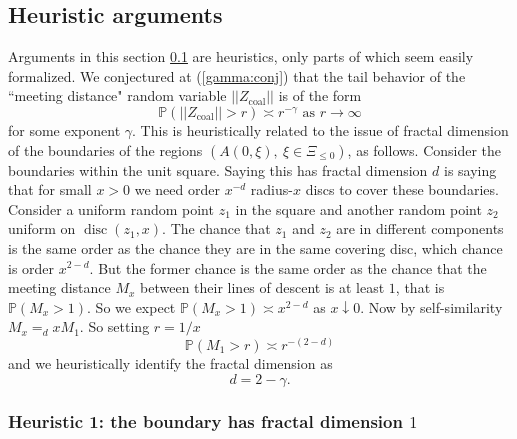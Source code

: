 \documentclass[12pt]{article}
\renewcommand{\Pr}{{\mathbb P}}
\newcommand{\Zcouple}{Z_{\mathrm{coal}}}
\DeclareMathOperator{\disc}{disc}
\begin{document}
\vspace*{-2.5in}








\subsection{Heuristic arguments}
\label{sec:2heuristics} 
Arguments in this section \ref{sec:2heuristics} are heuristics, only parts of which seem easily formalized.
We conjectured at (\ref{gamma:conj}) that the tail behavior of the ``meeting distance" random variable $|| \Zcouple ||$ 
is of the form 
\begin{equation}
\Pr( || \Zcouple || > r) \asymp r^{- \gamma} \mbox{ as } r \to \infty
\label{def:exponent}
\end{equation}
for some exponent $\gamma$.
This is heuristically related to the issue of fractal dimension of the boundaries of the 
regions $(A(0,\xi), \ \xi  \in \Xi_{\le 0})$, as follows.
Consider the  boundaries within the unit square.
Saying this has fractal dimension $d$ is saying that for small $x > 0$ we need order $x^{-d}$ radius-$x$ discs to cover these boundaries.  
Consider a uniform random point $z_1$ in the square and another random point $z_2$ uniform on $\disc(z_1,x)$.
The chance that $z_1$ and $z_2$  are in different components is the same order as the chance they are in the same covering disc, 
which chance is order $x^{2-d}$.  
But the former chance is the same order as the chance that the meeting distance $M_x$ between their lines of descent is at least  $1$, that is $\Pr(M_x > 1)$.  
So we expect $\Pr(M_x > 1) \asymp x^{2-d}$ as $x \downarrow 0$.
Now by self-similarity $M_x =_d x M_1$.  So setting $r = 1/x$
\begin{equation}
 \Pr(M_1 > r) \asymp r^{-(2-d)} 
 \label{def:exponent2}
\end{equation}
and we heuristically identify the fractal dimension as
\[
d = 2 - \gamma .
\]



 
 
 \subsubsection{Heuristic 1: the boundary has fractal dimension $1$}
\label{sec:istoofractal}
\end{document}
